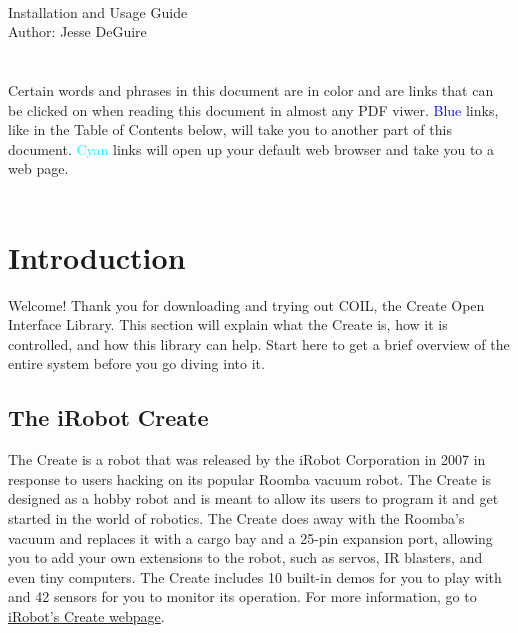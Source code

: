 \documentclass {article}
\begin{document}
 \\
{\large {Installation and Usage Guide}} \\
Author: Jesse DeGuire \\
\\
\\
Certain words and phrases in this document are in color and are links
that can be clicked on when reading this document in almost any PDF
viwer.  \textcolor{blue}{Blue} links, like in the Table of Contents
below, will take you to another part of this document.
\textcolor{cyan}{Cyan} links will
open up your default web browser and take you to a web page. \\
\\

\tableofcontents
\newpage


\section {Introduction}
Welcome!  Thank you for downloading and trying out COIL, the Create
Open Interface Library.  This section will explain what the Create is,
how it is controlled, and how this library can help.  Start here to
get a brief overview of the entire system before you go diving into
it.

\subsection {The iRobot Create}
The Create is a robot that was released by the iRobot Corporation in
2007 in response to users hacking on its popular Roomba vacuum robot.
The Create is designed as a hobby robot and is meant to allow its
users to program it and get started in the world of robotics.  The
Create does away with the Roomba's vacuum and replaces it with a cargo
bay and a 25-pin expansion port, allowing you to add your own
extensions to the robot, such as servos, IR blasters, and even tiny
computers.  The Create includes 10 built-in demos for you to play with
and 42 sensors for you to monitor its operation.  For more
information, go to
\href{http://www.irobot.com/sp.cfm?pageid=305}{iRobot's Create
  webpage}.
\end{document}

